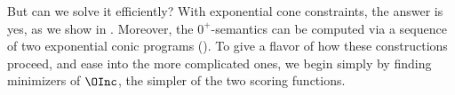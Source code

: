 But can we solve it efficiently?
% 
With exponential cone constraints,
the answer is yes, as we show in .
Moreover,
the $0^+$\!-semantics
can be computed via a sequence of two exponential conic programs ().
To give a flavor of how these constructions proceed, and ease into
the more complicated ones, we begin simply by finding minimizers of $\OInc$, the simpler of the two scoring functions.

